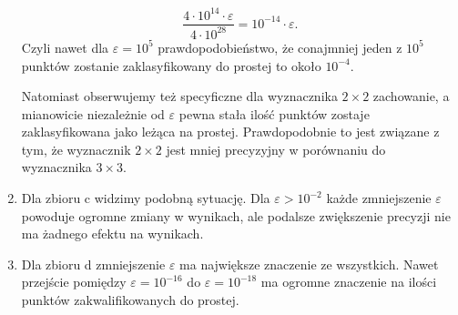\begin{enumerate}
$$    \frac{4 \cdot 10^{14} \cdot \varepsilon}{4 \cdot 10^{28}} =  10^{-14} \cdot \varepsilon.
$$
\quad Czyli nawet dla $\varepsilon = 10^5$ prawdopodobieństwo, że conajmniej jeden z $10^5$ punktów zostanie zaklasyfikowany 
do prostej to około $10^{-4}$.\par
\quad Natomiast obserwujemy też specyficzne dla wyznacznika $2\times 2$ zachowanie, 
a mianowicie niezależnie od $\varepsilon$ pewna stała ilość punktów zostaje zaklasyfikowana jako leżąca na prostej. 
Prawdopodobnie to jest związane z tym, że wyznacznik $2\times 2$ jest mniej precyzyjny 
w porównaniu do wyznacznika $3\times 3$.
\item \quad Dla zbioru c widzimy podobną sytuację. Dla $\varepsilon > 10^{-2}$ 
każde zmniejszenie $\varepsilon$ powoduje ogromne zmiany w wynikach, ale podalsze zwiększenie precyzji 
nie ma żadnego efektu na wynikach.

\item \quad Dla zbioru d zmniejszenie $\varepsilon$ ma największe znaczenie ze wszystkich. 
Nawet przejście pomiędzy $\varepsilon = 10^{-16}$ do $\varepsilon = 10^{-18}$ ma ogromne znaczenie 
na ilości punktów zakwalifikowanych do prostej.
\end{enumerate}
